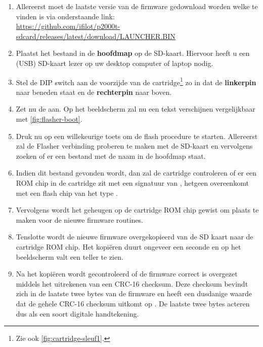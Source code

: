 \begin{enumerate}[noitemsep]
    \item Allereerst moet de laatste versie van de firmware gedownload worden welke te vinden is via onderstaande link:\\
    \url{https://github.com/ifilot/p2000t-sdcard/releases/latest/download/LAUNCHER.BIN}
    \item Plaatst het bestand  in de \textbf{hoofdmap} op de SD-kaart. Hiervoor heeft u een (USB) SD-kaart lezer op uw desktop computer of laptop nodig.
    \item Stel de DIP switch aan de voorzijde van de  cartridge\footnote{Zie ook \cref{fig:cartridge-sleuf1}.} zo in dat de \textbf{linkerpin} naar beneden staat en de \textbf{rechterpin} naar boven.
    \item Zet nu de  aan. Op het beeldscherm zal nu een tekst verschijnen vergelijkbaar met \cref{fig:flasher-boot}.
    \item Druk nu op een willekeurige toets om de flash procedure te starten. Allereerst zal de Flasher verbinding proberen te maken met de SD-kaart en vervolgens zoeken of er een bestand met de naam  in de hoofdmap staat. 
    \item Indien dit bestand gevonden wordt, dan zal de cartridge controleren of er een ROM chip in de cartridge zit met een signatuur van , hetgeen overeenkomt met een flash chip van het type .
    \item Vervolgens wordt het geheugen  op de cartridge ROM chip gewist om plaats te maken voor de nieuwe firmware routines.
    \item Tenslotte wordt de nieuwe firmware overgekopieerd van de SD kaart naar de cartridge ROM chip. Het kopiëren duurt ongeveer een seconde en op het beeldscherm valt een teller te zien.
    \item Na het kopiëren wordt gecontroleerd of de firmware correct is overgezet middels het uitrekenen van een CRC-16 checksum. Deze checksum bevindt zich in de laatste twee bytes van de firmware en heeft een dusdanige waarde dat de gehele CRC-16 checksum uitkomt op . De laatste twee bytes acteren dus als een soort digitale handtekening.    
\end{enumerate}

